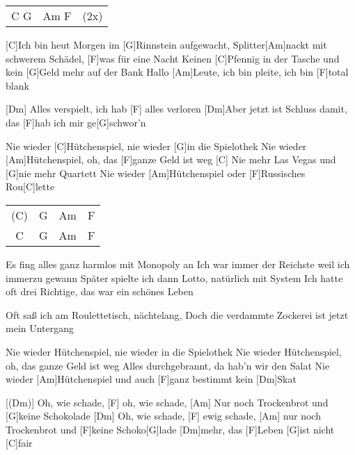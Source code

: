 

\begin{guitar}
	{\footnotesize\begin{tabular}{l|l l}
			C G & Am F & (2x)
	\end{tabular}}
	
	[C]Ich bin heut Morgen im [G]Rinnstein aufgewacht,
	Splitter[Am]nackt mit schwerem Schädel, [F]was für eine Nacht
	Keinen [C]Pfennig in der Tasche und kein [G]Geld mehr auf der Bank
	Hallo [Am]Leute, ich bin pleite, ich bin [F]total blank
	
	[Dm] Alles verspielt, ich hab [F] alles verloren
	[Dm]Aber jetzt ist Schluss damit, das [F]hab ich mir ge[G]schwor'n
	
	
	Nie wieder [C]Hütchenspiel, nie wieder [G]in die Spielothek
	Nie wieder [Am]Hütchenspiel, oh, das [F]ganze Geld ist weg
	[C] Nie mehr Las Vegas und [G]nie mehr Quartett
	Nie wieder [Am]Hütchenspiel oder [F]Russisches Rou[C]lette
	
	{\footnotesize\begin{tabular}{c|c|c|c}
			(C) & G & Am & F\\
			C & G & Am & F
	\end{tabular}}
	
	Es fing alles ganz harmlos mit Monopoly an
	Ich war immer der Reichste weil ich immerzu gewann
	Später spielte ich dann Lotto, natürlich mit System
	Ich hatte oft drei Richtige, das war ein schönes Leben
	
	Oft saß ich am Roulettetisch, nächtelang,
	Doch die verdammte Zockerei ist jetzt mein Untergang
	
	\pagebreak
	Nie wieder Hütchenspiel, nie wieder in die Spielothek
	Nie wieder Hütchenspiel, oh, das ganze Geld ist weg
	Alles durchgebrannt, da hab'n wir den Salat
	Nie wieder [Am]Hütchenspiel und auch [F]ganz bestimmt kein [Dm]Skat
	
	[(Dm)] Oh, wie schade, [F] oh, wie schade,
	[Am] Nur noch Trockenbrot und [G]keine Schokolade
	[Dm] Oh, wie schade, [F] ewig schade,
	[Am] nur noch Trockenbrot und [F]keine Schoko[G]lade [Dm]mehr,
	das [F]Leben [G]ist nicht [C]fair
	

\end{guitar}
